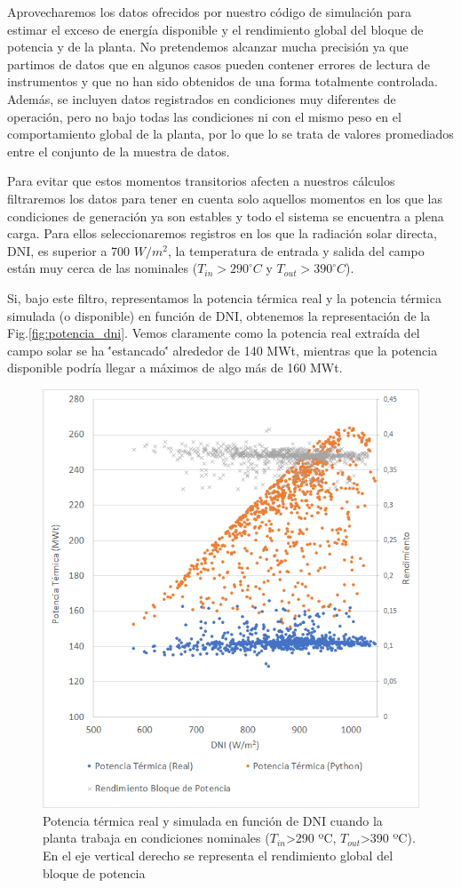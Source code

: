 Aprovecharemos los datos ofrecidos por nuestro código de simulación para estimar el exceso de energía disponible y el rendimiento global del bloque de potencia y de la planta. No pretendemos alcanzar mucha precisión ya que partimos de datos que en algunos casos pueden contener errores de lectura de instrumentos y que no han sido obtenidos de una forma totalmente controlada. Además, se incluyen datos registrados en condiciones muy diferentes de operación, pero no bajo todas las condiciones ni con el mismo peso en el comportamiento global de la planta, por lo que lo se trata de valores promediados entre el conjunto de la muestra de datos.

Para evitar que estos momentos transitorios afecten a nuestros cálculos filtraremos los datos para tener en cuenta solo aquellos momentos en los que las condiciones de generación ya son estables y todo el sistema se encuentra a plena carga. Para ellos seleccionaremos registros en los que la radiación solar directa, DNI, es superior a 700 $W/m^2$, la temperatura de entrada y salida del campo están muy cerca de las nominales ($T_{in}>290 ^\circ C$  y $T_{out}>390 ^\circ C$). 

Si, bajo este filtro, representamos la potencia térmica real y la potencia térmica simulada (o disponible) en función de DNI, obtenemos la representación de la Fig.\ref{fig:potencia_dni}. Vemos claramente como  la potencia real extraída del campo solar se ha \''estancado\'' alrededor de 140 MWt, mientras que la potencia disponible podría llegar a máximos de algo más de 160 MWt. 

\begin{figure}[H]
\includegraphics[width=0.9\linewidth]{images/potencia_dni_aste1b.png}
\caption[Potencia térmica real y simulada en función de DNI]{Potencia térmica real y simulada en función de DNI cuando la planta trabaja en condiciones nominales ($T_{in}$>290 ºC, $T_{out}$>390 ºC). En el eje vertical derecho se representa el rendimiento global del bloque de potencia} 
\label{fig:potenica_dni}
\end{figure}

